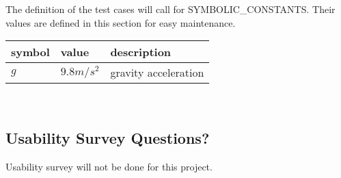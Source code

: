 \documentclass[12pt, titlepage]{article}
\begin{document}
The definition of the test cases will call for SYMBOLIC\_CONSTANTS.
Their values are defined in this section for easy maintenance.

\begin{tabular}{l l l} 
	\toprule		
	\textbf{symbol} & \textbf{value} & \textbf{description}\\
	\midrule 
	$g$ & $9.8 m/s^{2}$ & gravity acceleration\\	
	\bottomrule
\end{tabular}\\

\subsection{Usability Survey Questions?}

Usability survey will not be done for this project.
\end{document}
